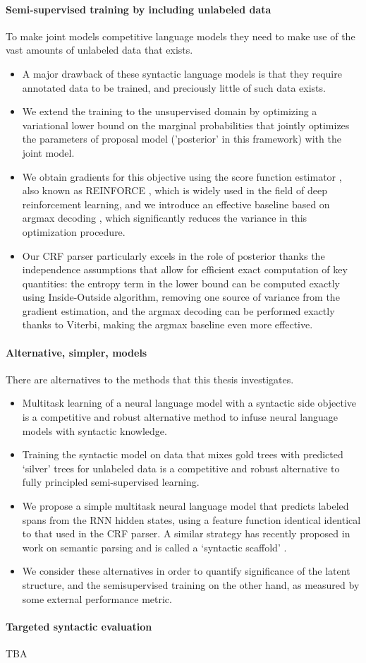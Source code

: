 \paragraph{Semi-supervised training by including unlabeled data} To make joint models competitive language models they need to make use of the vast amounts of unlabeled data that exists.
\begin{itemize}
  \item A major drawback of these syntactic language models is that they require annotated data to be trained, and preciously little of such data exists.
  \item We extend the training to the unsupervised domain by optimizing a variational lower bound on the marginal probabilities that jointly optimizes the parameters of proposal model ('posterior' in this framework) with the joint model.
  \item We obtain gradients for this objective using the score function estimator \citep{Fu2006}, also known as REINFORCE \citep{Williams1992:REINFORCE}, which is widely used in the field of deep reinforcement learning, and we introduce an effective baseline based on argmax decoding \citep{Rennie+2017:argmax-baseline}, which significantly reduces the variance in this optimization procedure.
  \item Our CRF parser particularly excels in the role of posterior thanks the independence assumptions that allow for efficient exact computation of key quantities: the entropy term in the lower bound can be computed exactly using Inside-Outside algorithm, removing one source of variance from the gradient estimation, and the argmax decoding can be performed exactly thanks to Viterbi, making the argmax baseline even more effective.
\end{itemize}

\paragraph{Alternative, simpler, models} There are alternatives to the methods that this thesis investigates.
\begin{itemize}
  \item Multitask learning of a neural language model with a syntactic side objective is a competitive and robust alternative method to infuse neural language models with syntactic knowledge.
  \item Training the syntactic model on data that mixes gold trees with predicted `silver' trees for unlabeled data is a competitive and robust alternative to fully principled semi-supervised learning.
  \item We propose a simple multitask neural language model that predicts labeled spans from the RNN hidden states, using a feature function identical identical to that used in the CRF parser. A similar strategy has recently proposed in work on semantic parsing and is called a `syntactic scaffold' \citep{Swayamdipta+2018:scaffold}.
  \item We consider these alternatives in order to quantify significance of the latent structure, and the semisupervised training on the other hand, as measured by some external performance metric.
\end{itemize}

\paragraph{Targeted syntactic evaluation}
TBA
